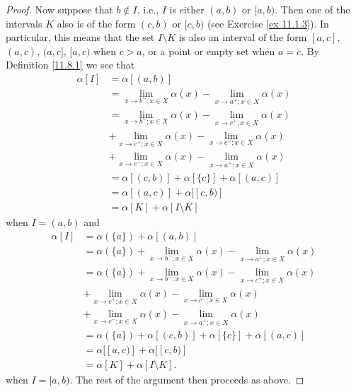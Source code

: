 \begin{proof}
    Now suppose that \(b \notin I\), i.e., \(I\) is either \((a, b)\) or \([a, b)\).
    Then one of the intervals \(K\) also is of the form \((c, b)\) or \([c, b)\) (see Exercise \ref{ex 11.1.3}).
            In particular, this means that the set \(I \setminus K\) is also an interval of the form \([a, c]\), \((a, c)\), \((a, c]\), \([a, c)\) when \(c > a\), or a point or empty set when \(a = c\).
    By Definition \ref{11.8.1} we see that
    \begin{align*}
        \alpha[I] & = \alpha[(a, b)]                                                              \\
                  & = \lim_{x \to b^- ; x \in X} \alpha(x) - \lim_{x \to a^+ ; x \in X} \alpha(x) \\
                  & = \lim_{x \to b^- ; x \in X} \alpha(x) - \lim_{x \to c^+ ; x \in X} \alpha(x) \\
                  & + \lim_{x \to c^+ ; x \in X} \alpha(x) - \lim_{x \to c^- ; x \in X} \alpha(x) \\
                  & + \lim_{x \to c^- ; x \in X} \alpha(x) - \lim_{x \to a^+ ; x \in X} \alpha(x) \\
                  & = \alpha[(c, b)] + \alpha[\{c\}] + \alpha[(a, c)]                             \\
                  & = \alpha[(a, c)] + \alpha[[c, b)]                                             \\
                  & = \alpha[K] + \alpha[I \setminus K]
    \end{align*}
    when \(I = (a, b)\) and
    \begin{align*}
        \alpha[I] & = \alpha(\{a\}) + \alpha[(a, b)]                                                              \\
                  & = \alpha(\{a\}) + \lim_{x \to b^- ; x \in X} \alpha(x) - \lim_{x \to a^+ ; x \in X} \alpha(x) \\
                  & = \alpha(\{a\}) + \lim_{x \to b^- ; x \in X} \alpha(x) - \lim_{x \to c^+ ; x \in X} \alpha(x) \\
                  & + \lim_{x \to c^+ ; x \in X} \alpha(x) - \lim_{x \to c^- ; x \in X} \alpha(x)                 \\
                  & + \lim_{x \to c^- ; x \in X} \alpha(x) - \lim_{x \to a^+ ; x \in X} \alpha(x)                 \\
                  & = \alpha(\{a\}) + \alpha[(c, b)] + \alpha[\{c\}] + \alpha[(a, c)]                             \\
                  & = \alpha[[a, c)] + \alpha[[c, b)]                                                             \\
                  & = \alpha[K] + \alpha[I \setminus K].
    \end{align*}
    when \(I = [a, b)\).
    The rest of the argument then proceeds as above.
\end{proof}

